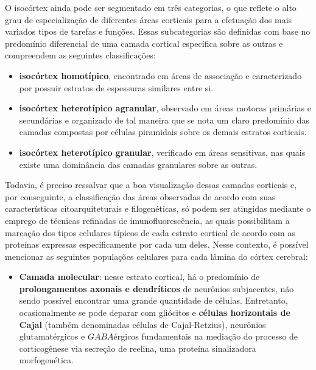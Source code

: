 \documentclass[
]{book}
\providecommand{\tightlist}{%
  \setlength{\itemsep}{0pt}\setlength{\parskip}{0pt}}
\begin{document}
O isocórtex ainda pode ser segmentado em três categorias, o que reflete o alto grau de especialização de diferentes áreas corticais para a efetuação dos mais variados tipos de tarefas e funções. Essas subcategorias são definidas com base no predomínio diferencial de uma camada cortical específica sobre as outras e compreendem as seguintes classificações:

\begin{itemize}
\tightlist
\item
  \textbf{isocórtex homotípico}, encontrado em áreas de associação e caracterizado por possuir estratos de espessuras similares entre si.
\item
  \textbf{isocórtex heterotípico agranular}, observado em áreas motoras primárias e secundárias e organizado de tal maneira que se nota um claro predomínio das camadas compostas por células piramidais sobre os demais estratos corticais.
\item
  \textbf{isocórtex heterotípico granular}, verificado em áreas sensitivas, nas quais existe uma dominância das camadas granulares sobre as outras.
\end{itemize}

Todavia, é preciso ressalvar que a boa visualização dessas camadas corticais e, por conseguinte, a classificação das áreas observadas de acordo com suas características citoarquiteturais e filogenéticas, só podem ser atingidas mediante o emprego de técnicas refinadas de imunofluorescência, as quais possibilitam a marcação dos tipos celulares típicos de cada estrato cortical de acordo com as proteínas expressas especificamente por cada um deles. Nesse contexto, é possível mencionar as seguintes populações celulares para cada lâmina do córtex cerebral:

\begin{itemize}
\tightlist
\item
  \textbf{Camada molecular}: nesse estrato cortical, há o predomínio de \textbf{prolongamentos axonais e dendríticos} de neurônios subjacentes, não sendo possível encontrar uma grande quantidade de células. Entretanto, ocasionalmente se pode deparar com gliócitos e \textbf{células horizontais de Cajal} (também denominadas células de Cajal-Retzius), neurônios glutamatérgicos e \(GABA\)érgicos fundamentais na mediação do processo de corticogênese via secreção de reelina, uma proteína sinalizadora morfogenética.
\end{itemize}
\end{document}
